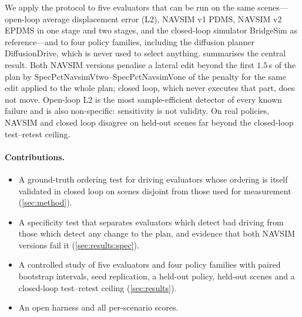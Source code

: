 We apply the protocol to five evaluators that can be run on the same scenes---open-loop average
displacement error (L2), NAVSIM v1 PDMS, NAVSIM v2 EPDMS in one stage and two stages, and the
closed-loop simulator BridgeSim as reference---and to four policy families, including the diffusion
planner DiffusionDrive, which is never used to select anything.
 summarises the central result.
Both NAVSIM versions penalise a lateral edit beyond the first $1.5$\,s of the plan by
\num{SpecPctNavsimVtwo}--\num{SpecPctNavsimVone} of the penalty for the same edit applied to the whole
plan; closed loop, which never executes that part, does not move.
Open-loop L2 is the most sample-efficient detector of every known failure and is also non-specific:
sensitivity is not validity.
On real policies, NAVSIM and closed loop disagree on held-out scenes far beyond the closed-loop
test--retest ceiling.

\paragraph{Contributions.}
\begin{itemize}
\item A ground-truth ordering test for driving evaluators whose ordering is itself validated in closed
loop on scenes disjoint from those used for measurement (\cref{sec:method}).
\item A specificity test that separates evaluators which detect bad driving from those which detect any
change to the plan, and evidence that both NAVSIM versions fail it (\cref{sec:results:spec}).
\item A controlled study of five evaluators and four policy families with paired bootstrap intervals,
seed replication, a held-out policy, held-out scenes and a closed-loop test--retest ceiling
(\cref{sec:results}).
\item An open harness and all per-scenario scores.
\end{itemize}
